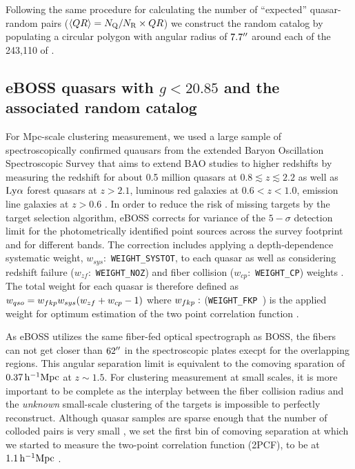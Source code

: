 \documentclass[useAMS,usenatbib]{mn2e}
\begin{document}
Following the same procedure for calculating the number of ``expected'' quasar-random pairs ($\langle QR \rangle = N_{\rm Q}/N_{\rm R} \times QR$) we construct the random catalog by populating a circular polygon with angular radius of $7.7\arcsec$ around each of the 243{,}110 of \citep[see section 3.1 of][for a detailed description of the taken steps]{ef17}. 


\subsection{eBOSS quasars with $g<20.85$ and the associated random catalog}\label{ldat}

For Mpc-scale clustering measurement, we used a large sample of spectroscopically confirmed quausars from the extended Baryon Oscillation Spectroscopic Survey \citep[eBOSS;][]{daw16} that aims to extend BAO studies to higher redshifts by measuring the redshift for about 0.5 million quasars at $0.8\lesssim z \lesssim 2.2$ as well as $\rm Ly\alpha$ forest quasars at $z>2.1$, luminous red galaxies at $0.6<z<1.0$, emission line galaxies at $z>0.6$ \citep[see ][for target selection criteria and process]{my15}. In order to reduce the risk of missing targets by the target selection algorithm, eBOSS corrects for variance of the $5-\sigma$ detection limit for the photometrically identified point sources across the survey footprint and for different bands. The correction includes applying a depth-dependence systematic weight, $w_{sys}:$ {\tt WEIGHT\_SYSTOT}, to each quasar as well as considering redshift failure ($w_{zf}:$ {\tt WEIGHT\_NOZ}) and fiber collision ($w_{cp}:$ {\tt WEIGHT\_CP}) weights \citep[see, ][for detail of the weight determination]{la17,rod17,bp17,an12,ross12}. The total weight for each quasar is therefore defined as $w_{qso} = w_{\sc fkp}w_{sys}(w_{zf}+w_{cp}-1)$ where $w_{\sc fkp}:$ ({\tt WEIGHT\_FKP  }) is the applied weight for optimum estimation of the two point correlation function \citep[see, ][]{fkp94}.


As eBOSS utilizes the same fiber-fed optical spectrograph as BOSS, the fibers can not get closer than $62 \arcsec$ in the spectroscopic plates execpt for the overlapping regions\citep{bl03}. This angular separation limit is equivalent to the comoving sparation of $0.37\, \rm h^{-1}Mpc$ at $z\sim 1.5$. For clustering measurement at small scales, it is more important to be complete as the interplay between the fiber collision radius and the {\it unknown} small-scale clustering of the targets is impossible to perfectly reconstruct. Although quasar samples are sparse enough that the number of colloded pairs is very small \citep[e.g.,][]{rod17}, we set the first bin of comoving separation at which we started to measure the two-point correlation function (2PCF), to be at $1.1 \, \rm h^{-1}Mpc$ \citep[see, e. g., ][for studies on the efficiency of fiber collision corrections at small scales]{gu12,ha17}. 
\end{document}

